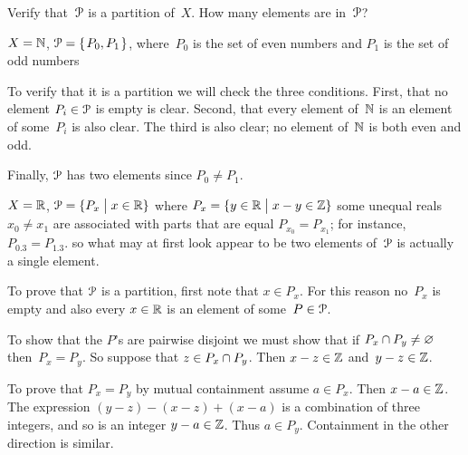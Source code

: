 \documentclass{ibl}  %
\begin{document}
\begin{center}
\end{center}

\begin{problem} 
  Verify that~$\EuScript{P}$ is a partition of~$X$.  
  How many elements are in~$\EuScript{P}$?
\begin{exes}
\begin{exercise} 
  $X=\mathbb{N}$, $\EuScript{P}=\mbox{$\{\hspace{0.1em}P_0,P_1\hspace{0.1em}\}$}$, 
  where~$P_0$ is the set of even numbers
  and $P_1$ is the set of odd numbers
\end{exercise}
\begin{answer}
  To verify that it is a partition we will check the three conditions.
  First, that no element $P_i\in \EuScript{P}$ is empty is clear.
  Second, that every element of~$\mathbb{N}$ is an element of some~$P_i$ is
  also clear.
  The third is also clear; no element of~$\mathbb{N}$ is both even and odd.

  Finally, $\EuScript{P}$ has two elements since $P_0\neq P_1$.  
\end{answer}
\begin{exercise} 
      $X=\mathbb{R}$, $\EuScript{P}=\{P_x \bigm| x\in \mathbb{R}\}$
      where $P_x=\{y\in\mathbb{R} \bigm| x-y\in \mathbb{Z}\}$
      \hspace{0.75em}\hint some unequal reals $x_0\neq x_1$ 
      are associated with parts that are equal $P_{x_0}=P_{x_1}$; 
      for instance, $P_{0.3}=P_{1.3}$.  
      so what may at first look appear to be two elements of~$\EuScript{P}$
      is actually a single element.
\end{exercise}
\begin{answer}
  To prove that $\EuScript{P}$ is a partition, first note that $x\in P_x$.
  For this reason no~$P_x$ is empty and also
  every $x\in\mathbb{R}$ is an element of some~$P\in\EuScript{P}$.

  To show that the $P$'s are pairwise disjoint 
  we must show that
  if $P_x\cap P_y\neq\varnothing$ then~$P_x=P_y$.
  So suppose that $z\in P_x\cap P_y$.
  Then $x-z\in\mathbb{Z}$ and~$y-z\in \mathbb{Z}$.
  
  To prove that $P_x=P_y$ by mutual containment assume $a\in P_x$.
  Then $x-a\in\mathbb{Z}$.
  The expression $(y-z)-(x-z)+(x-a)$ is a combination of three integers,
  and so is an integer $y-a\in\mathbb{Z}$.
  Thus $a\in P_y$.
  Containment in the other direction is similar.


\end{answer}
\end{exes}
\end{problem}
\end{document}
